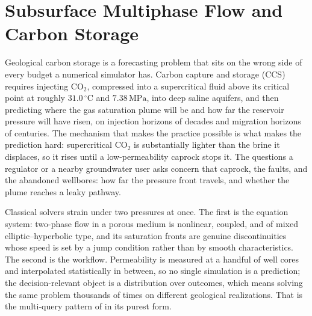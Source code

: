 
\chapter{Subsurface Multiphase Flow and Carbon Storage}
\label{ch:part3-subsurface-multiphase-flow-and-carbon-stor}
\label{sec:subsurface}

Geological carbon storage is a forecasting problem that sits on the wrong side of
every budget a numerical simulator has. Carbon capture and storage (CCS) requires
injecting $\mathrm{CO}_2$, compressed into a supercritical fluid above its critical
point at roughly $31.0\,^\circ\mathrm{C}$ and $7.38\,\mathrm{MPa}$, into deep
saline aquifers, and then predicting where the gas saturation plume will be and how
far the reservoir pressure will have risen, on injection horizons of decades and
migration horizons of centuries.
The mechanism that makes the practice possible is what makes the prediction hard:
supercritical $\mathrm{CO}_2$ is substantially lighter than the brine it displaces,
so it rises until a low-permeability caprock stops it.
The questions a regulator or a nearby groundwater user asks concern that caprock,
the faults, and the abandoned wellbores: how far the pressure front travels, and
whether the plume reaches a leaky pathway.

Classical solvers strain under two pressures at once. The first is the equation
system: two-phase flow in a porous medium is nonlinear, coupled, and of mixed
elliptic--hyperbolic type, and its saturation fronts are genuine discontinuities
whose speed is set by a jump condition rather than by smooth characteristics. The
second is the workflow. Permeability is measured at a handful of well cores and
interpolated statistically in between, so no single simulation is a prediction; the
decision-relevant object is a distribution over outcomes, which means solving the
same problem thousands of times on different geological realizations. That is the
multi-query pattern of
 in its purest form.

